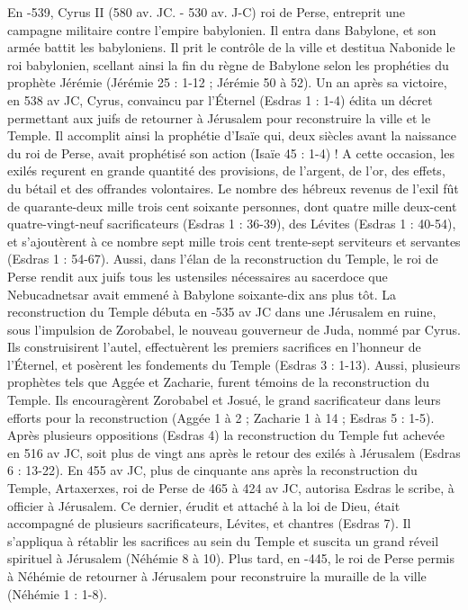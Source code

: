 En -539, Cyrus II (580 av. JC. - 530 av. J-C) roi de Perse, entreprit une campagne militaire contre l'empire babylonien. Il entra dans Babylone, et son armée battit les babyloniens. Il prit le contrôle de la ville et destitua Nabonide le roi babylonien, scellant ainsi la fin du règne de Babylone selon les prophéties du prophète Jérémie (Jérémie 25 : 1-12 ; Jérémie 50 à 52). Un an après sa victoire, en 538 av JC, Cyrus, convaincu par l’Éternel (Esdras 1 : 1-4) édita un décret permettant aux juifs de retourner à Jérusalem pour reconstruire la ville et le Temple. Il accomplit ainsi la prophétie d'Isaïe qui, deux siècles avant la naissance du roi de Perse, avait prophétisé son action (Isaïe 45 : 1-4) ! A cette occasion, les exilés reçurent en grande quantité des provisions, de l'argent, de l'or, des effets, du bétail et des offrandes volontaires.
Le nombre des hébreux revenus de l'exil fût de quarante-deux mille trois cent soixante personnes, dont quatre mille deux-cent quatre-vingt-neuf sacrificateurs (Esdras 1 : 36-39), des Lévites (Esdras 1 : 40-54), et s'ajoutèrent à ce nombre sept mille trois cent trente-sept serviteurs et servantes (Esdras 1 : 54-67). Aussi, dans l'élan de la reconstruction du Temple, le roi de Perse rendit aux juifs tous les ustensiles nécessaires au sacerdoce que Nebucadnetsar avait emmené à Babylone soixante-dix ans plus tôt.
La reconstruction du Temple débuta en -535 av JC dans une Jérusalem en ruine, sous l'impulsion de Zorobabel, le nouveau gouverneur de Juda, nommé par Cyrus. Ils construisirent l'autel, effectuèrent les premiers sacrifices en l'honneur de l’Éternel, et posèrent les fondements du Temple (Esdras 3 : 1-13). Aussi, plusieurs prophètes tels que Aggée et Zacharie, furent témoins de la reconstruction du Temple. Ils encouragèrent Zorobabel et Josué, le grand sacrificateur dans leurs efforts pour la reconstruction (Aggée 1 à 2 ; Zacharie 1 à 14 ; Esdras 5 : 1-5).
Après plusieurs oppositions (Esdras 4) la reconstruction du Temple fut achevée en 516 av JC, soit plus de vingt ans après le retour des exilés à Jérusalem (Esdras 6 : 13-22).
En 455 av JC, plus de cinquante ans après la reconstruction du Temple, Artaxerxes, roi de Perse de 465 à 424 av JC, autorisa Esdras le scribe, à officier à Jérusalem. Ce dernier, érudit et attaché à la loi de Dieu, était accompagné de plusieurs sacrificateurs, Lévites, et chantres (Esdras 7). Il s'appliqua à rétablir les sacrifices au sein du Temple et suscita un grand réveil spirituel à Jérusalem (Néhémie 8 à 10). Plus tard, en -445, le roi de Perse permis à Néhémie de retourner à Jérusalem pour reconstruire la muraille de la ville (Néhémie 1 : 1-8).
 
